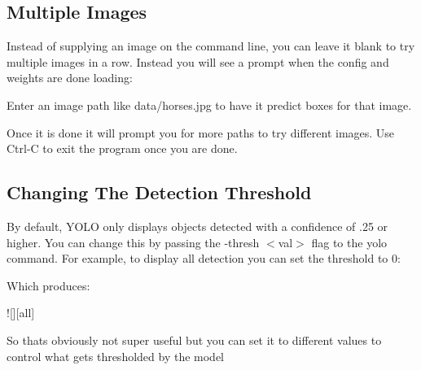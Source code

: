 \subsection*{Multiple Images}

Instead of supplying an image on the command line, you can leave it blank to try multiple images in a row. Instead you will see a prompt when the config and weights are done loading\+:


\begin{DoxyCode}{0}
\end{DoxyCode}
 Enter an image path like data/horses.\+jpg to have it predict boxes for that image.

Once it is done it will prompt you for more paths to try different images. Use Ctrl-\/C to exit the program once you are done.

\subsection*{Changing The Detection Threshold}

By default, Y\+O\+LO only displays objects detected with a confidence of .25 or higher. You can change this by passing the -\/thresh $<$val$>$ flag to the yolo command. For example, to display all detection you can set the threshold to 0\+:


\begin{DoxyCode}{0}
\end{DoxyCode}
 Which produces\+:

!\mbox{[}\mbox{]}\mbox{[}all\mbox{]}

So that\textquotesingle{}s obviously not super useful but you can set it to different values to control what gets thresholded by the model

